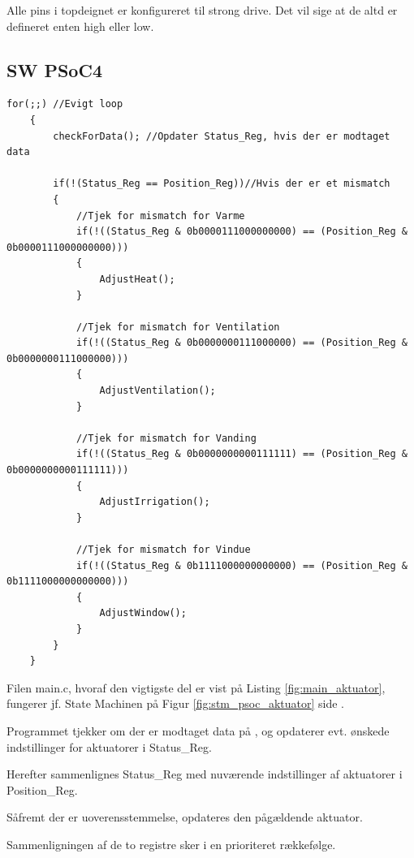 Alle pins i topdeignet er konfigureret til strong drive. 
Det vil sige at de altd er defineret enten high eller low.

\clearpage

\subsection{SW PSoC4}

\begin{lstlisting}[caption=Udsnit af main.c for PSoC4 i Aktuator, label=fig:main_aktuator]
for(;;) //Evigt loop
    {
        checkForData(); //Opdater Status_Reg, hvis der er modtaget data
        
        if(!(Status_Reg == Position_Reg))//Hvis der er et mismatch
        {
            //Tjek for mismatch for Varme
            if(!((Status_Reg & 0b0000111000000000) == (Position_Reg & 0b0000111000000000)))
            {
                AdjustHeat();
            }
            
            //Tjek for mismatch for Ventilation
            if(!((Status_Reg & 0b0000000111000000) == (Position_Reg & 0b0000000111000000)))
            {
                AdjustVentilation();
            }
            
            //Tjek for mismatch for Vanding
            if(!((Status_Reg & 0b0000000000111111) == (Position_Reg & 0b0000000000111111)))
            {
                AdjustIrrigation();
            }
            
            //Tjek for mismatch for Vindue
            if(!((Status_Reg & 0b1111000000000000) == (Position_Reg & 0b1111000000000000)))
            {
                AdjustWindow();
            }
        }
    }
\end{lstlisting}

Filen main.c, hvoraf den vigtigste del er vist på Listing \ref{fig:main_aktuator}, fungerer jf. State Machinen på Figur \ref{fig:stm_psoc_aktuator} side \pageref{fig:stm_psoc_aktuator}.

Programmet tjekker om der er modtaget data på \IIC, og opdaterer evt. ønskede indstillinger for aktuatorer i Status\_Reg. 

Herefter sammenlignes Status\_Reg med nuværende indstillinger af aktuatorer i Position\_Reg.

Såfremt der er uoverensstemmelse, opdateres den pågældende aktuator. 

Sammenligningen af de to registre sker i en prioriteret rækkefølge. 

